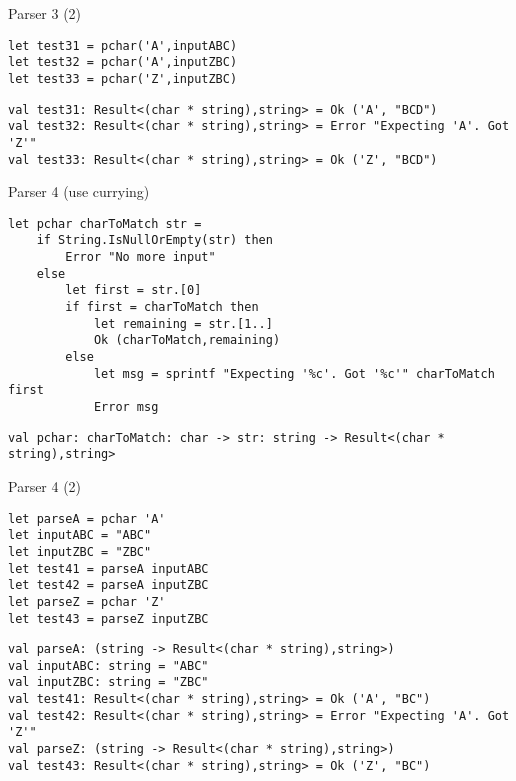\documentclass[t]{beamer}
\begin{document}
\begin{frame}[label={sec:org4f16965},fragile]{Parser 3 (2)}
 \begin{verbatim}
let test31 = pchar('A',inputABC) 
let test32 = pchar('A',inputZBC) 
let test33 = pchar('Z',inputZBC)
\end{verbatim}

\begin{verbatim}
val test31: Result<(char * string),string> = Ok ('A', "BCD")
val test32: Result<(char * string),string> = Error "Expecting 'A'. Got 'Z'"
val test33: Result<(char * string),string> = Ok ('Z', "BCD")
\end{verbatim}
\end{frame}

\begin{frame}[label={sec:orgf25d48e},fragile]{Parser 4 (use currying)}
 \begin{verbatim}
let pchar charToMatch str = 
    if String.IsNullOrEmpty(str) then
        Error "No more input"
    else
        let first = str.[0] 
        if first = charToMatch then
            let remaining = str.[1..]
            Ok (charToMatch,remaining)
        else
            let msg = sprintf "Expecting '%c'. Got '%c'" charToMatch first
            Error msg
\end{verbatim}

\begin{verbatim}
val pchar: charToMatch: char -> str: string -> Result<(char * string),string>
\end{verbatim}
\end{frame}

\begin{frame}[label={sec:org5144ddb},fragile]{Parser 4 (2)}
 \begin{verbatim}
let parseA = pchar 'A'
let inputABC = "ABC"
let inputZBC = "ZBC"
let test41 = parseA inputABC
let test42 = parseA inputZBC
let parseZ = pchar 'Z' 
let test43 = parseZ inputZBC
\end{verbatim}

\begin{verbatim}
val parseA: (string -> Result<(char * string),string>)
val inputABC: string = "ABC"
val inputZBC: string = "ZBC"
val test41: Result<(char * string),string> = Ok ('A', "BC")
val test42: Result<(char * string),string> = Error "Expecting 'A'. Got 'Z'"
val parseZ: (string -> Result<(char * string),string>)
val test43: Result<(char * string),string> = Ok ('Z', "BC")
\end{verbatim}
\end{frame}
\end{document}
